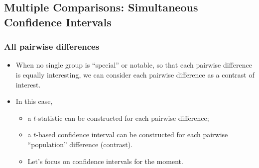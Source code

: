 \documentclass[a4paper]{article}
\begin{document}
\subsection{Multiple Comparisons: Simultaneous Confidence Intervals}
\subsubsection{All pairwise differences}
\begin{itemize}
	\item When no single group is ``special'' or notable, so that each pairwise difference is equally interesting, we can consider each pairwise difference as a contrast of interest.
	\item In this case,
	\begin{itemize}
		\item a \( t \)-statistic can be constructed for each pairwise difference;
		\item a \( t \)-based confidence interval can be constructed for each pairwise ``population'' difference (contrast).
		\item Let's focus on confidence intervals for the moment.
	\end{itemize}
\end{itemize}
\end{document}
